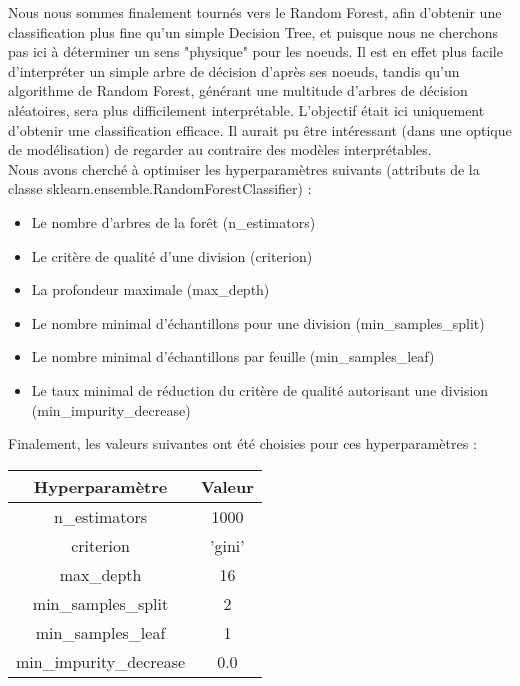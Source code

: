 \documentclass{article}
\begin{document}
Nous nous sommes finalement tournés vers le Random Forest, afin d'obtenir une classification plus fine qu'un simple Decision Tree, et puisque nous ne cherchons pas ici à déterminer un sens "physique" pour les noeuds. Il est en effet plus facile d'interpréter un simple arbre de décision d'après ses noeuds, tandis qu'un algorithme de Random Forest, générant une multitude d'arbres de décision aléatoires, sera plus difficilement interprétable. L'objectif était ici uniquement d'obtenir une classification efficace. Il aurait pu être intéressant (dans une optique de modélisation) de regarder au contraire des modèles interprétables.
\\

Nous avons cherché à optimiser les hyperparamètres suivants (attributs de la classe sklearn.ensemble.RandomForestClassifier) :
\\

\begin{itemize}
\item Le nombre d'arbres de la forêt (n\_estimators)
\item Le critère de qualité d'une division (criterion)
\item La profondeur maximale (max\_depth)
\item Le nombre minimal d'échantillons pour une division (min\_samples\_split)
\item Le nombre minimal d'échantillons par feuille (min\_samples\_leaf)
\item Le taux minimal de réduction du critère de qualité autorisant une division (min\_impurity\_decrease)
\end{itemize}
\vspace{0.5cm}



Finalement, les valeurs suivantes ont été choisies pour ces hyperparamètres :
\\

\begin{center}
 \begin{tabular}{|c|c|}
			 \hline
			 \textbf{Hyperparamètre} & \textbf{Valeur} \\
			 \hline
			 n\_estimators & 1000  \\
			 \hline
			 criterion & 'gini' \\
			 \hline
			 max\_depth & 16  \\
			 \hline
			 min\_samples\_split & 2 \\
			 \hline
			 min\_samples\_leaf & 1  \\
			 \hline
			 min\_impurity\_decrease & 0.0  \\
			 \hline
 \end{tabular}
\end{center}
\end{document}
